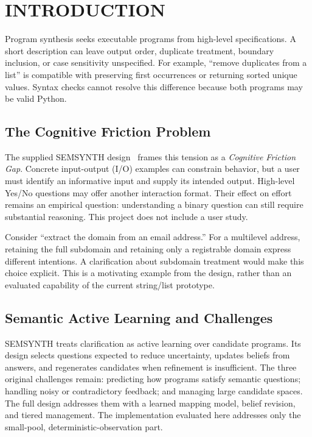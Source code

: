 \section{INTRODUCTION}
Program synthesis seeks executable programs from high-level specifications. A short description can leave output order, duplicate treatment, boundary inclusion, or case sensitivity unspecified. For example, ``remove duplicates from a list'' is compatible with preserving first occurrences or returning sorted unique values. Syntax checks cannot resolve this difference because both programs may be valid Python.

\subsection{The Cognitive Friction Problem}
The supplied SEMSYNTH design~\cite{semsynthdesign} frames this tension as a \textit{Cognitive Friction Gap}. Concrete input-output (I/O) examples can constrain behavior, but a user must identify an informative input and supply its intended output. High-level Yes/No questions may offer another interaction format. Their effect on effort remains an empirical question: understanding a binary question can still require substantial reasoning. This project does not include a user study.

Consider ``extract the domain from an email address.'' For a multilevel address, retaining the full subdomain and retaining only a registrable domain express different intentions. A clarification about subdomain treatment would make this choice explicit. This is a motivating example from the design, rather than an evaluated capability of the current string/list prototype.

\subsection{Semantic Active Learning and Challenges}
SEMSYNTH treats clarification as active learning over candidate programs. Its design selects questions expected to reduce uncertainty, updates beliefs from answers, and regenerates candidates when refinement is insufficient. The three original challenges remain: predicting how programs satisfy semantic questions; handling noisy or contradictory feedback; and managing large candidate spaces. The full design addresses them with a learned mapping model, belief revision, and tiered management. The implementation evaluated here addresses only the small-pool, deterministic-observation part.

